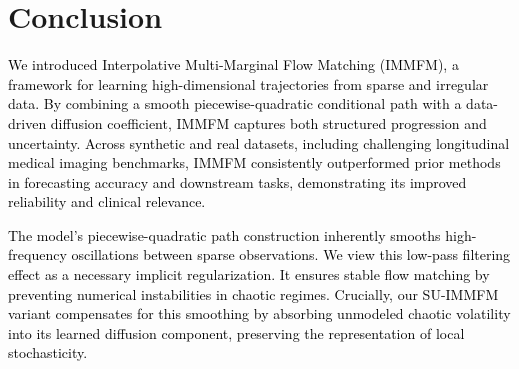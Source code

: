 \documentclass[twoside]{article}
\begin{document}





\section{Conclusion}
\label{sec:conclusion}

\textcolor{black}{We introduced Interpolative Multi-Marginal Flow Matching (IMMFM), a framework for learning high-dimensional trajectories from sparse and irregular data. By combining a smooth piecewise-quadratic conditional path with a data-driven diffusion coefficient, IMMFM captures both structured progression and uncertainty. Across synthetic and real datasets, including challenging longitudinal medical imaging benchmarks, IMMFM consistently outperformed prior methods in forecasting accuracy and downstream tasks, demonstrating its improved reliability and clinical relevance. }

\textcolor{black}{The model's piecewise-quadratic path construction inherently smooths high-frequency oscillations between sparse observations. We view this low-pass filtering effect as a necessary implicit regularization. It ensures stable flow matching by preventing numerical instabilities in chaotic regimes. Crucially, our SU-IMMFM variant compensates for this smoothing by absorbing unmodeled chaotic volatility into its learned diffusion component, preserving the representation of local stochasticity.}
\end{document}
